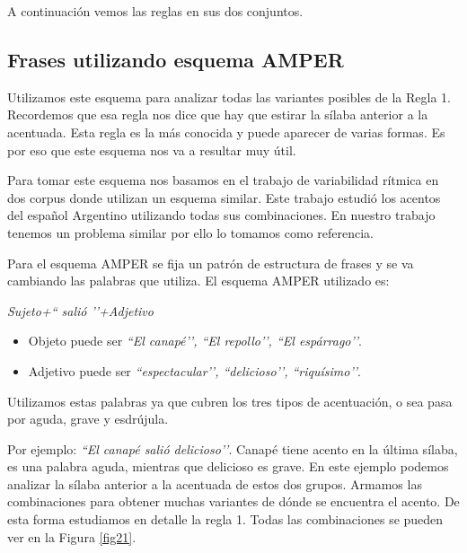 A continuación vemos las reglas en sus dos conjuntos.

\subsection{Frases utilizando esquema AMPER}


Utilizamos este esquema para analizar todas las variantes posibles de la Regla 1. Recordemos que esa regla nos dice que hay que estirar la sílaba anterior a la acentuada. Esta regla es la más conocida y puede aparecer de varias formas. Es por eso que este esquema nos va a resultar muy útil. 

Para tomar este esquema nos basamos en el trabajo de variabilidad rítmica en dos corpus \cite{amper} donde utilizan un esquema similar. Este trabajo estudió los acentos del español Argentino utilizando todas sus combinaciones. En nuestro trabajo tenemos un problema similar por ello lo tomamos como referencia.

Para el esquema AMPER se fija un patrón de estructura de frases y se va cambiando las palabras que utiliza. 
El esquema AMPER utilizado es: 
\begin{center}
\textit{Sujeto+`` salió ’’+Adjetivo} 
\end{center}

\begin{itemize}
	\item Objeto puede ser \textit{``El canapé’’, ``El repollo’’, ``El espárrago’’}.
	\item Adjetivo puede ser \textit{``espectacular’’, ``delicioso’’, ``riquísimo’’}.
\end{itemize}
Utilizamos estas palabras ya que cubren los tres tipos de acentuación, o sea pasa por aguda, grave y esdrújula. 

Por ejemplo: \textit{``El canapé salió delicioso’’}. Canapé tiene acento en la última sílaba, es una palabra aguda, mientras que delicioso es grave. En este ejemplo podemos analizar la sílaba anterior a la acentuada de estos dos grupos. Armamos las combinaciones para obtener muchas variantes de dónde se encuentra el acento. De esta forma estudiamos en detalle la regla 1. Todas las combinaciones se pueden ver en la Figura \ref{fig21}.

